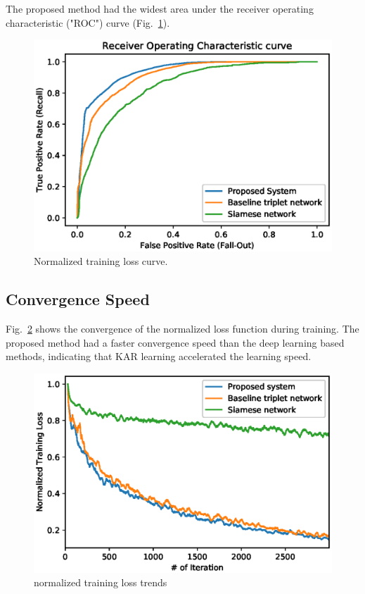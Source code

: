 The proposed method had the widest area under the receiver operating characteristic ("ROC") curve (Fig.~\ref{fig_roc}).
\begin{figure}[!ht]
    \includegraphics[width=\textwidth]{fig_roc_v15.eps}
    \caption{Normalized training loss curve.} \label{fig_roc}
\end{figure}
\subsection{Convergence Speed}
Fig.~\ref{fig_loss} shows the convergence of the normalized loss function during training. The proposed method had a faster convergence speed than the deep learning based methods, indicating that KAR learning accelerated the learning speed.
 \begin{figure}[!ht]
    \includegraphics[width=\textwidth]{normalized_loss_curve_ma30_v3.eps}
    \caption{normalized training loss trends} \label{fig_loss}
\end{figure}
